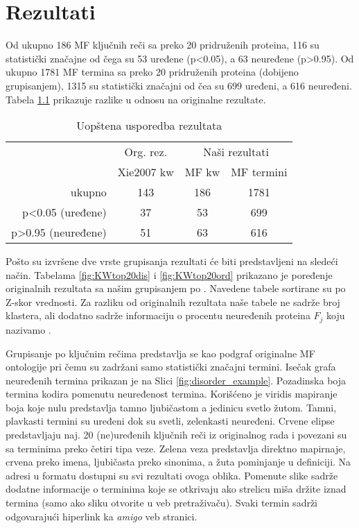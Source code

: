 
\chapter{Rezultati} %

\label{Rezultati} %

Od ukupno 186 MF ključnih reči sa preko 20 pridruženih proteina, 116 su
statistički značajne od čega su 53 uređene (p<0.05), a 63 neuređene (p>0.95).
Od ukupno 1781 MF termina sa preko 20 pridruženih proteina (dobijeno
grupisanjem), 1315 su statistički značajni od čea su 699 uređeni, a 616
neuređeni.  Tabela \ref{tab:kw_uopsteno} prikazuje razlike u odnosu na
originalne rezultate.

\begin{table}[htpb]
\begin{tabular}{|r|c|c|c|}
  \hline
             & Org. rez.  & \multicolumn{2}{c|}{ Naši rezultati} \\
             & Xie2007 kw & MF kw  & MF termini \\
  \hline                             
  ukupno     & 143        & 186      & 1781      \\
  p<0.05 (uređene)    & 37         & 53       & 699     \\ 
  p>0.95 (neuređene)    & 51         & 63       & 616     \\
  \hline
\end{tabular}
  \centering
  \caption{Uopštena usporedba rezultata}
  \label{tab:kw_uopsteno}
\end{table}


Pošto su izvršene dve vrste grupisanja rezultati će biti predstavljeni na
sledeći način. Tabelama \ref{fig:KWtop20dis} i \ref{fig:KWtop20ord} prikazano
je poređenje originalnih rezultata sa našim grupisanjem po . Navedene tabele sortirane su po Z-skor vrednosti.  Za razliku od
originalnih rezultata naše tabele ne sadrže broj klastera, ali dodatno sadrže 
informaciju o procentu neuređenih proteina $F_j$ koju nazivamo
. 

Grupisanje po ključnim rečima predstavlja se kao podgraf originalne MF
ontologije pri čemu su zadržani samo statistički značajni termini.  Isečak
grafa neuređenih termina prikazan je na Slici \ref{fig:disorder_example}.
Pozadinska boja termina kodira pomenutu neuređenost termina. Korišćeno je
viridis \cite{viridis} mapiranje boja koje nulu predstavlja tamno ljubičastom a
jedinicu svetlo žutom. Tamni, plavkasti termini su uređeni dok su svetli,
zelenkasti neuređeni. Crvene elipse predstavljaju naj. 20 (ne)uređenih ključnih
reči iz originalnog rada i povezani su sa terminima preko četiri tipa veze.
Zelena veza predstavlja direktno mapirnaje, crvena preko imena, ljubičasta
preko sinonima, a žuta pominjanje u definiciji.  Na adresi \cite{rezultati} u
 formatu dostupni su svi rezultati ovoga oblika.  Pomenute slike
sadrže dodatne informacije o terminima koje se otkrivaju ako strelicu miša držite
iznad termina (samo ako sliku otvorite u veb pretraživaču).  Svaki termin
sadrži odgovarajući hiperlink ka \textit{amigo} veb stranici.

